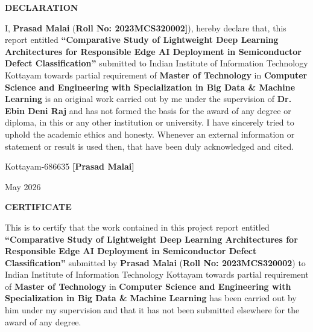 \documentclass[12pt,a4wide]{report}
\theoremstyle{plain}
\theoremstyle{definition}
\theoremstyle{remark}
\begin{document}
\clearpage
 \setcounter{page}{2}
\begin{center}
{\large{\bf{DECLARATION}}}
\end{center}


\noindent I, \textbf {Prasad Malai} (\textbf{Roll No: 2023MCS320002]}), hereby declare that, this report entitled
\textbf{``Comparative Study of Lightweight Deep Learning Architectures for Responsible Edge AI Deployment in Semiconductor Defect Classification''} submitted to Indian
Institute of Information Technology Kottayam towards partial
requirement of {\bf Master of Technology} in \textbf{Computer Science and Engineering with Specialization in Big Data \& Machine Learning}
is an original work carried out by me under the supervision of
\textbf{Dr. Ebin Deni Raj} and has not formed the basis for the award
of any degree or diploma, in this or any other institution or
university. I have sincerely tried to uphold the academic ethics
and honesty. Whenever an external information or statement or
result is used then, that have been duly acknowledged and cited.

\vspace{4cm}

\noindent Kottayam-686635 \hfill \textbf{[Prasad Malai]}

\noindent May 2026

\clearpage


 \setcounter{page}{3}
\begin{center}
{\large{\bf{CERTIFICATE}}}
\end{center}


\noindent This is to certify that the work contained in this
project report entitled \textbf{``Comparative Study of Lightweight Deep Learning Architectures for Responsible Edge AI Deployment in Semiconductor Defect Classification''}
submitted by \textbf{Prasad Malai} (\textbf{Roll No: 2023MCS320002}) to Indian Institute of Information Technology Kottayam
towards partial requirement of {\bf Master of Technology} in
\textbf{Computer Science and Engineering with Specialization in Big Data \& Machine Learning} has been carried out by him under my
supervision and that it has not been submitted elsewhere for the
award of any degree.


\vspace{4cm}
\end{document}
